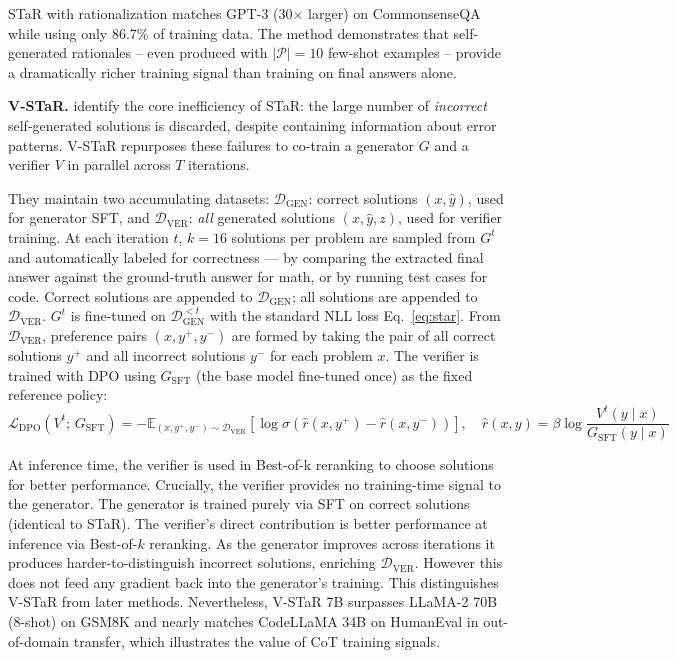STaR with rationalization matches GPT-3 (30$\times$ larger) on CommonsenseQA while using only 86.7\% of training data. The method demonstrates that self-generated rationales -- even produced with $|\mathcal{P}| = 10$ few-shot examples -- provide a dramatically richer training signal than training on final answers alone.

\vspace{1em}
\textbf{V-STaR.} \autocite{hosseini2024vstartrainingverifiersselftaught} identify the core inefficiency of STaR: the large number of \emph{incorrect} self-generated solutions is discarded, despite containing information about error patterns. V-STaR repurposes these failures to co-train a generator $G$ and a verifier $V$ in parallel across $T$ iterations.

They maintain two accumulating datasets: $\mathcal{D}_{\text{GEN}}$: correct solutions $(x, \hat{y})$, used for generator SFT, and $\mathcal{D}_{\text{VER}}$: \emph{all} generated solutions $(x, \hat{y}, z)$, used for verifier training. At each iteration $t$, $k=16$ solutions per problem are sampled from $G^t$ and automatically labeled for correctness --- by comparing the extracted final answer against the ground-truth answer for math, or by running test cases for code. Correct solutions are appended to $\mathcal{D}_{\text{GEN}}$; all solutions are appended to $\mathcal{D}_{\text{VER}}$. $G^t$ is fine-tuned on $\mathcal{D}_{\text{GEN}}^{<t}$ with the standard NLL loss Eq.~\eqref{eq:star}. From $\mathcal{D}_{\text{VER}}$, preference pairs $(x, y^+, y^-)$ are formed by taking the pair of all correct solutions $y^+$ and all incorrect solutions $y^-$ for each problem $x$. The verifier is trained with DPO using $G_{\text{SFT}}$ (the base model fine-tuned once) as the fixed reference policy:
\begin{equation}
    \mathcal{L}_{\text{DPO}}(V^t;\, G_{\text{SFT}}) = -\mathbb{E}_{(x, y^+, y^-) \sim \mathcal{D}_{\text{VER}}} \!\left[\log \sigma\!\left(\hat{r}(x, y^+) - \hat{r}(x, y^-)\right)\right], \quad \hat{r}(x, y) = \beta \log \frac{V^t(y \mid x)}{G_{\text{SFT}}(y \mid x)}
    \label{eq:vstar}
\end{equation}

At inference time, the verifier is used in Best-of-k reranking to choose solutions for better performance. Crucially, the verifier provides no training-time signal to the generator. The generator is trained purely via SFT on correct solutions (identical to STaR). The verifier's direct contribution is better performance at inference via Best-of-$k$ reranking. As the generator improves across iterations it produces harder-to-distinguish incorrect solutions, enriching $\mathcal{D}_{\text{VER}}$. However this does not feed any gradient back into the generator's training. This distinguishes V-STaR from later methods. Nevertheless, V-STaR 7B surpasses LLaMA-2 70B (8-shot) on GSM8K and nearly matches CodeLLaMA 34B on HumanEval in out-of-domain transfer, which illustrates the value of CoT training signals.

